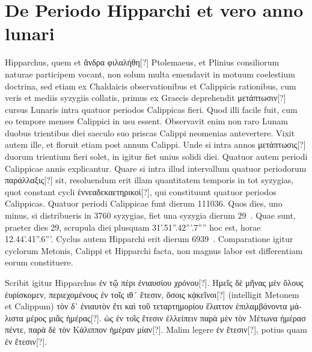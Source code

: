 \section{De Periodo Hipparchi et vero anno lunari}
%
Hipparchus, quem et \textgreek{ἄνδρα φιλαλήθη[?]} Ptolemaeus,
 et Plinius
consiliorum naturae participem vocant, non solum multa emendavit
in motuum coelestium doctrina, sed etiam ex Chaldaicis
observationibus et Calippicis rationibus, cum veris et mediis syzygiis
collatis, primus ex Graecis deprehendit \textgreek{μετάπτωσιν[?]}
 cursus Lunaris intra
quatuor periodos Calippicas fieri.
Quod illi facile fuit, cum eo tempore
menses Calippici in usu essent.
Observavit enim non raro
Lunam duobus trientibus diei saeculo suo priscas Calippi neomenias
antevertere.
Vixit autem ille, et floruit etiam post  annum
Calippi.
Unde si intra  annos \textgreek{μετάπτωσις[?]}
 duorum trientium fieri
solet, in  igitur fiet unius solidi diei.
Quatuor autem periodi Calippicae
 annis explicantur.
Quare si intra illud intervallum
quatuor periodorum \textgreek{παράλλαξις[?]} sit,
 resoluendum erit illam quantitatem
temporis in tot syzygias, quot constant  cycli
 \textgreek{ἐννεαδεκαετηρικοὶ[?]},
qui constituunt quatuor periodos Calippicas.
Quatuor periodi Calippicae
funt dierum 111036.
%
Quos dies, uno minus, si distribueris in
3760 syzygias, fiet una syzygia dierum 29~.
Quae sunt, praeter dies
29, scrupula diei plusquam 31'.51''.42'''.7'''' hoc est, horae 12.44'.41''.6'''.
Cyclus autem Hipparchi erit dierum 6939~.
Comparatione
igitur cyclorum  Metonis, Calippi et Hipparchi facta, non magnus
labor est differentiam eorum  constituere.
%
\begin{table}[t]
  
\end{table}
%
Scribit igitur Hipparchus
\textgreek{ἐν τῷ πὲρι ἐνιαυσίου χρόνου[?]}.
\textgreek{Ημεῖς δὲ μῆνας μὲν ὅλους ἑυρίσκομεν, περιεχομένους
ἐν τοῖς ιθ´ ἔτεσιν, ὅσοις κᾀκεῖνοι[?]} (intelligit Metonem et Calippum)
\textgreek{τὸν δ᾽ ἐνιαυτὸν ἔτι καὶ τοῦ τεταρτημορίου
ἔλαττον ἐπιλαμβάνοντα μάλιστα μέρος
μιᾶς ἡμέρας[?]}.
\textgreek{ὡς ἐν τοῖς  ἔτεσιν ἐλλείπειν παρὰ
μὲν τὸν Μέτωνα ἡμέρασ πέντε, παρὰ δὲ
τὸν Κάλιππον ἡμέραν μίαν[?]}.
Malim legere
\textgreek{ἐν  ἔτεσιν[?]},
potius quam \textgreek{ἐν  ἔτεσιν[?]}.
